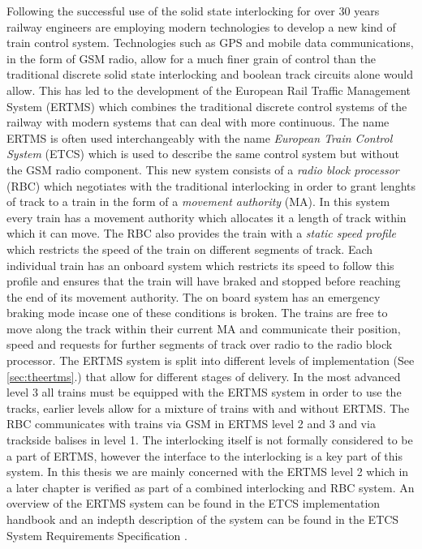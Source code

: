 \label{chapter:ERTMS}

Following the successful use of the solid state interlocking for over 30 years railway engineers are  employing modern technologies to develop a new kind of train control system.  Technologies such as GPS and mobile data communications, in the form of GSM radio,  allow for  a much finer grain of control than the traditional discrete solid state interlocking and  boolean track circuits alone would allow. 
This has led to the development of the European Rail Traffic Management System (ERTMS) which combines the traditional discrete control systems of the railway with modern systems that can deal with more continuous. The name ERTMS is often used interchangeably with the name \emph{European Train Control System} (ETCS) which is used to describe the same control system but without the GSM radio component. This new system consists of a \emph{radio block processor} (RBC) which negotiates with the traditional interlocking in order to grant lenghts of track to a train in the form of a \emph{movement authority} (MA). In this system every train has a movement authority which allocates it a length of track within which it can move. The RBC also provides the train with a \emph{static speed profile} which restricts the speed of the train on different segments of track. Each individual train has an onboard system which restricts its speed to follow this profile and ensures that the train will have braked and stopped before reaching the end of its movement authority. The on board system has an emergency braking mode incase one of these conditions is broken. The trains are free to move along the  track within their current MA and communicate their position, speed and requests for further segments of track over radio to the radio block processor. The ERTMS system is split into different levels of implementation (See \ref{sec:theertms}.) that allow for different stages of delivery. In the most advanced level 3 all trains must be equipped with the ERTMS system in order to use the tracks, earlier levels allow for a mixture of trains with and without ERTMS. The RBC communicates with trains via GSM in ERTMS level 2 and 3 and via trackside balises in level 1. The interlocking itself is not formally considered to be a part of ERTMS, however the interface to the interlocking is a key part of this system. In this thesis we are mainly concerned with the ERTMS level 2 which in a later chapter is verified as part of a combined interlocking and RBC system. An overview of the ERTMS system can be found in the ETCS implementation handbook \cite{ETCSHB} and an indepth description of the system can be found in the ETCS System Requirements Specification \cite{ETCSSRS}.

